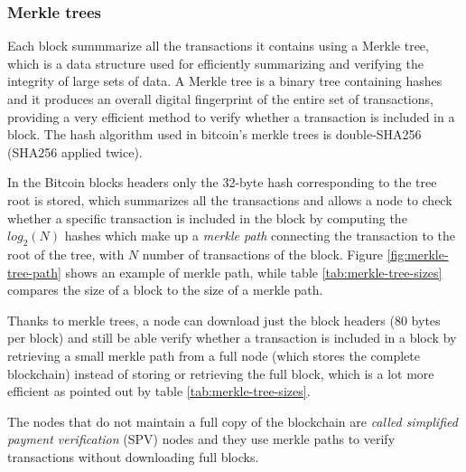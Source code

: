 \subsubsection{Merkle trees}\label{sec:merkle-trees} Each block summmarize all the transactions it
contains using a Merkle tree, which is a data structure used for efficiently
summarizing and verifying the integrity of large sets of data. A Merkle tree  is
a binary tree containing hashes and it produces an overall digital fingerprint
of the entire set of transactions, providing a very efficient method to verify
whether a transaction is included in a block. The hash algorithm used in
bitcoin’s merkle trees is double-SHA256 (SHA256 applied twice).

In the Bitcoin blocks headers only the 32-byte hash corresponding to the tree
root is stored, which summarizes all the transactions and allows a node to check
whether a specific transaction is included in the block by computing the
$log_2(N)$ hashes which make up a \emph{merkle path} connecting the transaction
to the root of the tree, with $N$ number of transactions of the block. Figure
\ref{fig:merkle-tree-path} shows an example of merkle path, while table
\ref{tab:merkle-tree-sizes} compares the size of a block to the size of a merkle
path.

 Thanks to merkle trees, a node can download just the block headers (80 bytes
 per block) and still be able verify whether a transaction is included in a
 block by retrieving a small merkle path from a full node (which stores the
 complete blockchain) instead of storing or retrieving the full block, which
 is a lot more efficient as pointed out by table \ref{tab:merkle-tree-sizes}.

 The nodes that do not maintain a full copy of the blockchain are \emph{called
 simplified payment verification} (SPV) nodes and they use merkle paths to
 verify transactions without downloading full blocks.

 \begin{table}[h!]
 \footnotesize

 \centering
 \caption{Merkle tree efficiency}
 \label{tab:merkle-tree-sizes}
 \end{table}


